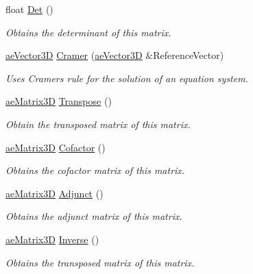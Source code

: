 \begin{DoxyCompactItemize}
\item 
float \hyperlink{structae_core_1_1ae_matrix3_d_af52f3ecfab6df7acedff6c33c082473a}{Det} ()
\begin{DoxyCompactList}\small\item\em Obtains the determinant of this matrix. \end{DoxyCompactList}\item 
\hyperlink{structae_core_1_1ae_vector3_d}{ae\+Vector3D} \hyperlink{structae_core_1_1ae_matrix3_d_ada938ec3554815f416fb7924fdbe70a5}{Cramer} (\hyperlink{structae_core_1_1ae_vector3_d}{ae\+Vector3D} \&Reference\+Vector)
\begin{DoxyCompactList}\small\item\em Uses Cramer\textquotesingle{}s rule for the solution of an equation system. \end{DoxyCompactList}\item 
\hyperlink{structae_core_1_1ae_matrix3_d}{ae\+Matrix3D} \hyperlink{structae_core_1_1ae_matrix3_d_a19f9e68533e43fa8b21cc1c8b6082e57}{Transpose} ()
\begin{DoxyCompactList}\small\item\em Obtain the transposed matrix of this matrix. \end{DoxyCompactList}\item 
\hyperlink{structae_core_1_1ae_matrix3_d}{ae\+Matrix3D} \hyperlink{structae_core_1_1ae_matrix3_d_a5e415974d5a71778a16e6d2496b85db1}{Cofactor} ()
\begin{DoxyCompactList}\small\item\em Obtains the cofactor matrix of this matrix. \end{DoxyCompactList}\item 
\hyperlink{structae_core_1_1ae_matrix3_d}{ae\+Matrix3D} \hyperlink{structae_core_1_1ae_matrix3_d_af7d6fb28dd7132c1df767c9d68430631}{Adjunct} ()
\begin{DoxyCompactList}\small\item\em Obtains the adjunct matrix of this matrix. \end{DoxyCompactList}\item 
\hyperlink{structae_core_1_1ae_matrix3_d}{ae\+Matrix3D} \hyperlink{structae_core_1_1ae_matrix3_d_a892eb52a8bdfeb7985f491ec044a0da7}{Inverse} ()
\begin{DoxyCompactList}\small\item\em Obtains the transposed matrix of this matrix. \end{DoxyCompactList}\end{DoxyCompactItemize}
